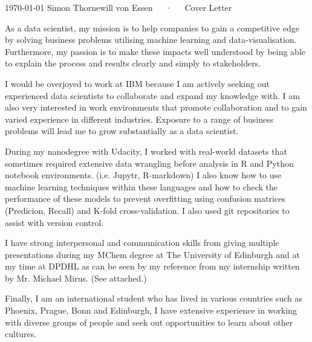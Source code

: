 \documentclass[11pt, a4paper]{awesome-cv}
\begin{document}
\makecvheader[R]

\makecvfooter
  {\today}
  {Simon Thornewill von Essen~~~·~~~Cover Letter}
  {}

\makelettertitle

\begin{cvletter}

As a data scientist, my mission is to help companies to gain a competitive edge
by solving business problems utilising machine learning and data-visualisation.
Furthermore, my passion is to make these impacts well understood by being able
to explain the process and results clearly and simply to stakeholders.

I would be overjoyed to work at IBM because I am actively seeking out experienced data
scientists to collaborate and expand my knowledge with. I am also very interested
in work environments that promote collaboration and to gain varied experience in
different industries. Exposure to a range of business problems will lead me to grow
substantially as a data scientist.


During my nanodegree with Udacity, I worked with real-world datasets that sometimes
required extensive data wrangling before analysis in R and Python notebook environments.
(i.e. Jupytr, R-markdown) I also know how to use machine learning techniques within
these languages and how to check the performance of these models to prevent overfitting
using confusion matrices (Predicion, Recall) and K-fold cross-validation. I also
used git repositories to assist with version control.

I have strong interpersonal and communication skills from giving multiple
presentations during my MChem degree at The University of Edinburgh and at my time
at DPDHL as can be seen by my reference from  my internship written by Mr.
Michael Mirus. (See attached.)

Finally, I am an international student who has lived in various countries such as
Phoenix, Prague, Bonn and Edinburgh, I have extensive experience in working with
diverse groups of people and seek out opportunities to learn about other cultures.


\end{cvletter}
\end{document}
